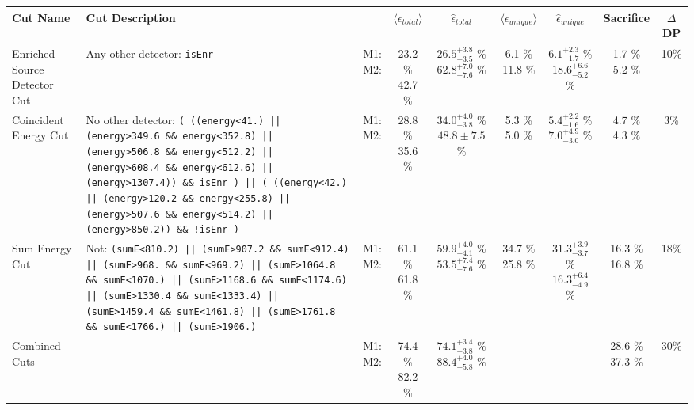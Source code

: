 \small
\begin{tabular}{|>{\raggedright}m{3cm}|m{6cm}|c c c|c c|c|c|}
\hline
  Cut Name & Cut Description &   & $\langle\epsilon_{total}\rangle$ & $\hat{\epsilon}_{total}$ & $\langle\epsilon_{unique}\rangle$ & $\hat{\epsilon}_{unique}$ & Sacrifice & $\Delta$DP \\
\hline
  Enriched Source Detector Cut & \tiny Any other detector: \texttt{isEnr} & \makecell{M1: \\ M2:} & \makecell{23.2 \% \\ 42.7 \%} & \makecell{$26.5^{+3.8}_{-3.5}$ \% \\ $62.8^{+7.0}_{-7.6}$ \%} & \makecell{6.1 \% \\ 11.8 \%} & \makecell{$6.1^{+2.3}_{-1.7}$ \% \\ $18.6^{+6.6}_{-5.2}$ \%} & \makecell{1.7 \% \\ 5.2 \%} & 10\% \\
  Coincident Energy Cut & \tiny No other detector: \texttt{( ((energy<41.) || (energy>349.6 \&\& energy<352.8) || (energy>506.8 \&\& energy<512.2) || (energy>608.4 \&\& energy<612.6) || (energy>1307.4)) \&\& isEnr ) || ( ((energy<42.) || (energy>120.2 \&\& energy<255.8) || (energy>507.6 \&\& energy<514.2) || (energy>850.2)) \&\& !isEnr )} & \makecell{M1: \\ M2:} & \makecell{28.8 \% \\ 35.6 \%} & \makecell{$34.0^{+4.0}_{-3.8}$ \% \\ $48.8 \pm 7.5$ \%} & \makecell{5.3 \% \\ 5.0 \%} & \makecell{$5.4^{+2.2}_{-1.6}$ \% \\ $7.0^{+4.9}_{-3.0}$ \%} & \makecell{4.7 \% \\ 4.3 \%} & 3\% \\
  Sum Energy Cut & \tiny Not:  \texttt{(sumE<810.2) || (sumE>907.2 \&\& sumE<912.4) || (sumE>968. \&\& sumE<969.2) || (sumE>1064.8 \&\& sumE<1070.) || (sumE>1168.6 \&\& sumE<1174.6) || (sumE>1330.4 \&\& sumE<1333.4) || (sumE>1459.4 \&\& sumE<1461.8) || (sumE>1761.8 \&\& sumE<1766.) || (sumE>1906.)} & \makecell{M1: \\ M2:} & \makecell{61.1 \% \\ 61.8 \%} & \makecell{$59.9^{+4.0}_{-4.1}$ \% \\ $53.5^{+7.4}_{-7.6}$ \%} & \makecell{34.7 \% \\ 25.8 \%} & \makecell{$31.3^{+3.9}_{-3.7}$ \% \\ $16.3^{+6.4}_{-4.9}$ \%} & \makecell{16.3 \% \\ 16.8 \%} & 18\% \\
  Combined Cuts &  & \makecell{M1: \\ M2:} & \makecell{74.4 \% \\ 82.2 \%} & \makecell{$74.1^{+3.4}_{-3.8}$ \% \\ $88.4^{+4.0}_{-5.8}$ \%} & -- & -- & \makecell{28.6 \% \\ 37.3 \%} & 30\% \\
\hline
\end{tabular}
